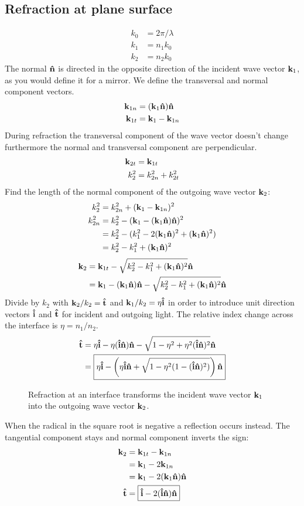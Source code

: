 \documentclass[twocolumn,DIV19]{scrartcl}
\begin{document}
\subsection{Refraction at plane surface}
\begin{align}
  k_0&=2\pi/\lambda\\
  k_1&=n_1 k_0\\
  k_2&=n_2 k_0
\end{align}
The normal $\mathbf{\hat{n}}$ is directed in the opposite direction of the incident
wave vector $\mathbf{k}_1$, as you would define it for a mirror. We define the
transversal and normal component vectors.
\begin{align}
  \mathbf{k}_{1n}&=(\mathbf{k}_1\mathbf{\hat{n}})\mathbf{\hat{n}}\\ 
  \mathbf{k}_{1t}&=\mathbf{k}_1 - \mathbf{k}_{1n}
\end{align}
During refraction the transversal component of the wave vector doesn't
change furthermore the normal and transversal component are
perpendicular.
\begin{align}
  \mathbf{k}_{2t}&=\mathbf{k}_{1t}\\
  k_2^2&=k_{2n}^2 + k_{2t}^2
\end{align}
Find the length of the normal component of the outgoing wave vector $\mathbf{k}_2$:
\begin{align}
  k_2^2&=k_{2n}^2 + (\mathbf{k}_1 - \mathbf{k}_{1n})^2\\
  k_{2n}^2&=k_2^2-(\mathbf{k}_1-(\mathbf{k}_1\mathbf{\hat{n}})\mathbf{\hat{n}})^2\\
  &= k_2^2-(k_1^2-2(\mathbf{k}_1\mathbf{\hat{n}})^2+(\mathbf{k}_1\mathbf{\hat{n}})^2)\\
  &= k_2^2-k_1^2+(\mathbf{k}_1\mathbf{\hat{n}})^2
\end{align}
\begin{align}
  \mathbf{k}_2&=\mathbf{k}_{1t}-\sqrt{k_2^2-k_1^2+(\mathbf{k}_1\mathbf{\hat{n}})^2}\mathbf{\hat{n}}\\
  &=\mathbf{k}_1-(\mathbf{k}_1\mathbf{\hat{n}})\mathbf{\hat{n}}-\sqrt{k_2^2-k_1^2+(\mathbf{k}_1\mathbf{\hat{n}})^2}\mathbf{\hat{n}}
\end{align}
Divide by $k_2$ with $\mathbf{k}_2/k_2=\mathbf{\hat{t}}$ and $\mathbf{k}_1/k_2=\eta\mathbf{\hat{i}}$ in order to
introduce unit direction vectors $\mathbf{\hat{i}}$ and $\mathbf{\hat{t}}$ for incident and
outgoing light. The relative index change across the interface is
$\eta=n_1/n_2$.
\begin{align}
  \mathbf{\hat{t}}&=\eta\mathbf{\hat{i}}-\eta(\mathbf{\hat{i}}\mathbf{\hat{n}})\mathbf{\hat{n}}-\sqrt{1-\eta^2+\eta^2(\mathbf{\hat{i}}\mathbf{\hat{n}})^2}\mathbf{\hat{n}}\\
  &=\boxed{\eta\mathbf{\hat{i}}-\left(\eta\mathbf{\hat{i}}\mathbf{\hat{n}}+\sqrt{1-\eta^2(1-(\mathbf{\hat{i}}\mathbf{\hat{n}})^2)}\right)\mathbf{\hat{n}}}
\end{align}
 \begin{figure}
   \centering
   
   \caption{Refraction at an interface transforms the incident wave
     vector $\mathbf{k}_1$ into the outgoing wave vector $\mathbf{k}_2$.}
 \end{figure}
 When the radical in the square root is negative a reflection occurs
 instead. The tangential component stays and normal component inverts
 the sign:
 \begin{align}
   \mathbf{k}_2&=\mathbf{k}_{1t}-\mathbf{k}_{1n}\\
   &=\mathbf{k}_1 - 2\mathbf{k}_{1n}\\
   &=\mathbf{k}_1-2(\mathbf{k}_1\mathbf{\hat{n}})\mathbf{\hat{n}}\\
   \mathbf{\hat{t}}&=\boxed{\mathbf{\hat{i}}-2(\mathbf{\hat{i}}\mathbf{\hat{n}})\mathbf{\hat{n}}}
 \end{align}
\end{document}
